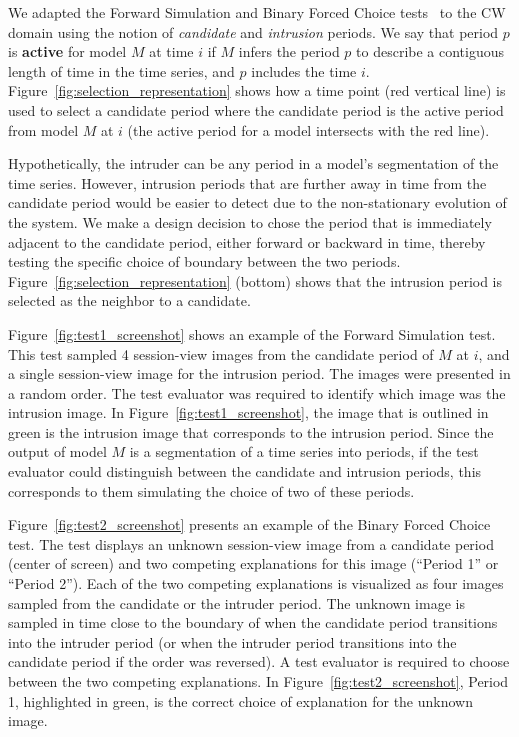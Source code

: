 \documentclass[letterpaper]{article} %
\begin{document}
We adapted the Forward Simulation and Binary Forced Choice tests~\cite{doshi2017roadmap} to the CW domain using the notion of \textit{candidate} and \textit{intrusion} periods.
We say that period $p$ is \textbf{active} for model $M$ at time $i$ if  $M$ infers the period $p$ to describe a contiguous length of time in the time series, and $p$ includes the time $i$.
Figure~\ref{fig:selection_representation} shows how a time point (red vertical line) is used to select a candidate period where the candidate period is the active period from model $M$ at $i$ (the active period for a model intersects with the red line).

Hypothetically, the intruder can be any period in a model's segmentation of the time series.
However, intrusion periods that are further away in time from the candidate period would be easier to detect due to the non-stationary evolution of the system.
We make a design decision to chose the period that is immediately adjacent to the candidate period, either forward or backward in time, thereby testing the specific choice of boundary between the two periods.
Figure~\ref{fig:selection_representation} (bottom) shows that the intrusion period is selected as the neighbor to a candidate.


Figure~\ref{fig:test1_screenshot} shows an example of the Forward Simulation test.
This test sampled 4 session-view images from the candidate period of $M$ at $i$, and a single session-view image for the intrusion period.
The images were presented in a random order.
The test evaluator was required to identify which image was the intrusion image.
In Figure~\ref{fig:test1_screenshot}, the image that is outlined in green is the intrusion image that corresponds to the intrusion period.
Since the output of model $M$ is a segmentation of a time series into periods, if the test evaluator could distinguish between the candidate and intrusion periods, this corresponds to them simulating the choice of two of these periods.


Figure~\ref{fig:test2_screenshot} presents an example of the Binary Forced Choice test.
The test displays an unknown session-view image from a candidate period (center of screen) and two competing explanations for this image (``Period 1'' or ``Period 2'').
Each of the  two competing explanations is visualized as four images sampled from the candidate or the intruder period.
The unknown image is sampled in time close to the boundary of when the candidate period transitions into the intruder period (or when the intruder period transitions into the candidate period if the order was reversed).
A test evaluator is required to choose between the two competing explanations.
In Figure~\ref{fig:test2_screenshot}, Period 1, highlighted in green, is the correct choice of explanation for the unknown image.
\end{document}
